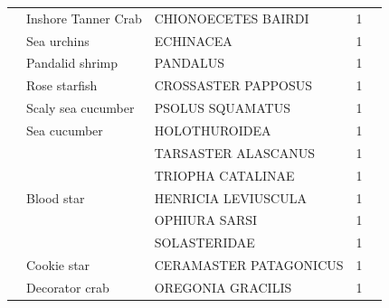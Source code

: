 \documentclass[12pt]{article}\usepackage[]{graphicx}\usepackage[]{color}
\begin{document}
\begin{longtable}[l]{lllrr}
 & Inshore Tanner Crab & CHIONOECETES BAIRDI & 1 & \\
 & Sea urchins & ECHINACEA & 1 & \\
 & Pandalid shrimp & PANDALUS & 1 & \\
 & Rose starfish & CROSSASTER PAPPOSUS & 1 & \\
 & Scaly sea cucumber & PSOLUS SQUAMATUS & 1 & \\
 & Sea cucumber & HOLOTHUROIDEA & 1 & \\
 &  & TARSASTER ALASCANUS & 1 & \\
 &  & TRIOPHA CATALINAE & 1 & \\
 & Blood star & HENRICIA LEVIUSCULA & 1 & \\
 &  & OPHIURA SARSI & 1 & \\
 &  & SOLASTERIDAE & 1 & \\
 & Cookie star & CERAMASTER PATAGONICUS & 1 & \\
 & Decorator crab & OREGONIA GRACILIS & 1 & \\*
\end{longtable}
\endgroup{}
\end{document}
